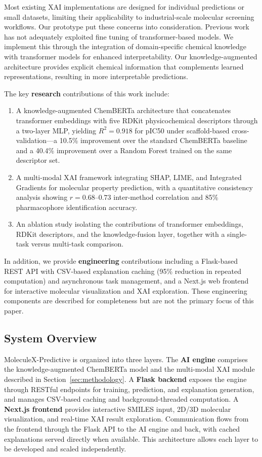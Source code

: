 \documentclass[preprint,12pt]{elsarticle}
\begin{document}
Most existing XAI implementations are designed for individual predictions or small datasets, limiting their applicability to industrial-scale molecular screening workflows. Our prototype put these concerns into consideration. Previous work has not adequately exploited fine tuning of transformer-based models. We implement this through the integration of domain-specific chemical knowledge with transformer models for enhanced interpretability. Our knowledge-augmented architecture provides explicit chemical information that complements learned representations, resulting in more interpretable predictions.

The key \textbf{research} contributions of this work include:

\begin{enumerate}
\item A knowledge-augmented ChemBERTa architecture that concatenates transformer embeddings with five RDKit physicochemical descriptors through a two-layer MLP, yielding $R^2 = 0.918$ for pIC50 under scaffold-based cross-validation---a 10.5\% improvement over the standard ChemBERTa baseline and a 40.4\% improvement over a Random Forest trained on the same descriptor set.
\item A multi-modal XAI framework integrating SHAP, LIME, and Integrated Gradients for molecular property prediction, with a quantitative consistency analysis showing $r = 0.68$--$0.73$ inter-method correlation and 85\% pharmacophore identification accuracy.
\item An ablation study isolating the contributions of transformer embeddings, RDKit descriptors, and the knowledge-fusion layer, together with a single-task versus multi-task comparison.
\end{enumerate}

In addition, we provide \textbf{engineering} contributions including a Flask-based REST API with CSV-based explanation caching (95\% reduction in repeated computation) and asynchronous task management, and a Next.js web frontend for interactive molecular visualization and XAI exploration. These engineering components are described for completeness but are not the primary focus of this paper.

\subsection*{System Overview}

MoleculeX-Predictive is organized into three layers. The \textbf{AI engine} comprises the knowledge-augmented ChemBERTa model and the multi-modal XAI module described in Section~\ref{sec:methodology}. A \textbf{Flask backend} exposes the engine through RESTful endpoints for training, prediction, and explanation generation, and manages CSV-based caching and background-threaded computation. A \textbf{Next.js frontend} provides interactive SMILES input, 2D/3D molecular visualization, and real-time XAI result exploration. Communication flows from the frontend through the Flask API to the AI engine and back, with cached explanations served directly when available. This architecture allows each layer to be developed and scaled independently.
\end{document}
